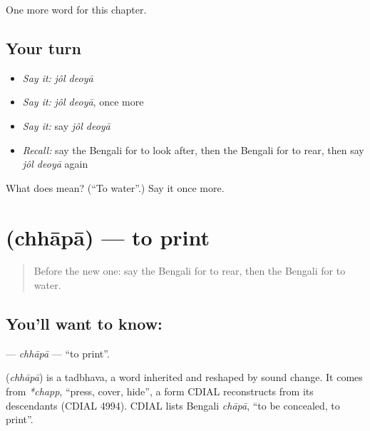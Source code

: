 \begin{grammarlens}[title={What you've built}]
One more word for this chapter.
\end{grammarlens}

\subsection*{Your turn}
\begin{itemize}
\raggedright
  \item \emph{Say it:} \emph{jôl deoyā}
  \item \emph{Say it:} \emph{jôl deoyā}, once more
  \item \emph{Say it:} say \emph{jôl deoyā}
  \item \emph{Recall:} say the Bengali for to look after, then the Bengali for to rear, then say \emph{jôl deoyā} again
\end{itemize}

\begin{tcolorbox}[breakable,colback=teal!4,colframe=teal!35!black,title={Before you move on}]
What does   mean? (\textquotedblleft{}To water\textquotedblright{}.) Say it once more.
\end{tcolorbox}
\section[\texorpdfstring{\bn{ছাপা} (chhāpā)}{ছাপা (chhāpā)}]{ (chhāpā) — to print}

\label{lesson:BN-C180-chhapa}



\begin{quote}
Before the new one: say the Bengali for to rear, then the Bengali for to water.
\end{quote}

\subsection*{You'll want to know: }
\textbf{} — \emph{chhāpā} — \textquotedblleft{}to print\textquotedblright{}.

\begin{cousinweb}
\textbf{} (\emph{chhāpā}) is a tadbhava, a word inherited and reshaped by sound change. It comes from \emph{*chapp}, \textquotedblleft{}press, cover, hide\textquotedblright{}, a form CDIAL reconstructs from its descendants (CDIAL 4994). CDIAL lists Bengali \emph{chāpā}, \textquotedblleft{}to be concealed, to print\textquotedblright{}.
\end{cousinweb}

